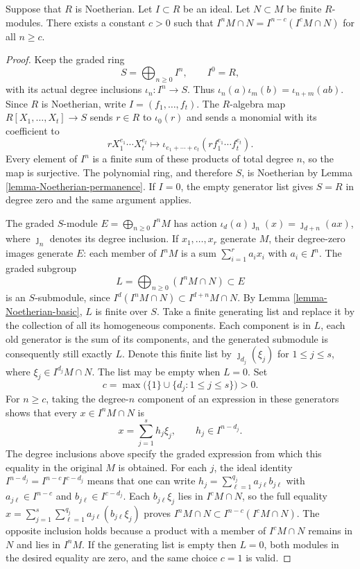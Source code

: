 \begin{lemma}
\label{lemma-Artin-Rees}
Suppose that $R$ is Noetherian. Let $I \subset R$ be an ideal.
Let $N \subset M$ be finite $R$-modules.
There exists a constant $c > 0$ such that
$I^n M \cap N  =  I^{n-c}(I^cM \cap N)$ for all $n \geq c$.
\end{lemma}

\begin{proof}
Keep the graded ring
$$
S=\bigoplus_{n\geq0}I^n,\qquad I^0=R,
$$
with its actual degree inclusions $\iota_n:I^n\to S$.
Thus $\iota_n(a)\iota_m(b)=\iota_{n+m}(ab)$.
Since $R$ is Noetherian, write $I=(f_1,\ldots,f_t)$.
The $R$-algebra map $R[X_1,\ldots,X_t]\to S$ sends $r\in R$
to $\iota_0(r)$ and sends a monomial with its coefficient to
$$
rX_1^{e_1}\cdots X_t^{e_t}
\longmapsto
\iota_{e_1+\cdots+e_t}
 (rf_1^{e_1}\cdots f_t^{e_t}).
$$
Every element of $I^n$ is a finite sum of these products of total
degree $n$, so the map is surjective. The polynomial ring, and
therefore $S$, is Noetherian by Lemma
\ref{lemma-Noetherian-permanence}. If $I=0$, the empty generator
list gives $S=R$ in degree zero and the same argument applies.

The graded $S$-module
$E=\bigoplus_{n\geq0}I^nM$ has action
$\iota_d(a)\jmath_n(x)=\jmath_{d+n}(ax)$, where $\jmath_n$
denotes its degree inclusion. If $x_1,\ldots,x_r$ generate
$M$, their degree-zero images generate $E$: each member of
$I^nM$ is a sum $\sum_{i=1}^r a_ix_i$ with $a_i\in I^n$.
The graded subgroup
$$
L=\bigoplus_{n\geq0}(I^nM\cap N)\subset E
$$
is an $S$-submodule, since
$I^d(I^nM\cap N)\subset I^{d+n}M\cap N$.
By Lemma \ref{lemma-Noetherian-basic}, $L$ is finite over $S$.
Take a finite generating list and replace it by the collection of
all its homogeneous components. Each component is in $L$, each
old generator is the sum of its components, and the generated
submodule is consequently still exactly $L$. Denote this finite
list by $\jmath_{d_j}(\xi_j)$ for $1\leq j\leq s$, where
$\xi_j\in I^{d_j}M\cap N$. The list may be empty when $L=0$.
Set
$$
c=\max\bigl(\{1\}\cup\{d_j:1\leq j\leq s\}\bigr)>0.
$$
For $n\geq c$, taking the degree-$n$ component of an expression
in these generators shows that every $x\in I^nM\cap N$ is
$$
x=\sum_{j=1}^s h_j\xi_j,\qquad h_j\in I^{n-d_j}.
$$
The degree inclusions above specify the graded expression from
which this equality in the original $M$ is obtained.
For each $j$, the ideal identity
$I^{n-d_j}=I^{n-c}I^{c-d_j}$ means that one can write
$h_j=\sum_{\ell=1}^{q_j}a_{j\ell}b_{j\ell}$ with
$a_{j\ell}\in I^{n-c}$ and $b_{j\ell}\in I^{c-d_j}$.
Each $b_{j\ell}\xi_j$ lies in $I^cM\cap N$, so the full
equality
$x=\sum_{j=1}^s\sum_{\ell=1}^{q_j}
a_{j\ell}(b_{j\ell}\xi_j)$ proves
$I^nM\cap N\subset I^{n-c}(I^cM\cap N)$.
The opposite inclusion holds because a product with a member of
$I^cM\cap N$ remains in $N$ and lies in $I^nM$.
If the generating list is empty then $L=0$, both modules in the
desired equality are zero, and the same choice $c=1$ is valid.


\end{proof}
